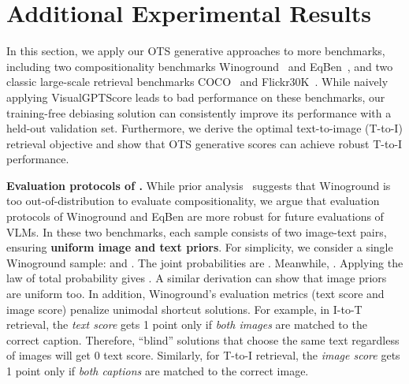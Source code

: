 \documentclass{article} \usepackage{iclr2024_conference,times}
\begin{document}
\section{Additional Experimental Results}
\label{sec:additional_exp}
In this section, we apply our OTS generative approaches to more benchmarks, including two compositionality benchmarks Winoground~\citep{winoground} and EqBen~\citep{eqben}, and two classic large-scale retrieval benchmarks COCO~\citep{coco} and Flickr30K~\citep{flickr30k}. While naively applying VisualGPTScore leads to bad performance on these benchmarks, our training-free debiasing solution can consistently improve its performance with a held-out validation set. Furthermore, we derive the optimal text-to-image (T-to-I) retrieval objective and show that OTS generative scores can achieve robust T-to-I performance. 

{\bf Evaluation protocols of \citet{winoground}.} While prior analysis~\citep{diwan2022winoground, aro} suggests that Winoground is too out-of-distribution to evaluate compositionality, we argue that evaluation protocols of Winoground and EqBen are more robust for future evaluations of VLMs. In these two benchmarks, each sample consists of two image-text pairs, ensuring {\bf uniform image and text priors}. For simplicity, we consider a single Winoground sample:  and . The joint probabilities are . Meanwhile, . Applying the law of total probability gives . A similar derivation can show that image priors are uniform too. In addition, Winoground's evaluation metrics (text score and image score) penalize unimodal shortcut solutions. For example, in I-to-T retrieval, the {\em text score} gets 1 point only if {\em both images} are matched to the correct caption. Therefore, ``blind'' solutions that choose the same text regardless of images will get 0 text score. Similarly, for T-to-I retrieval, the {\em image score} gets 1 point only if {\em both captions} are matched to the correct image.
\end{document}
